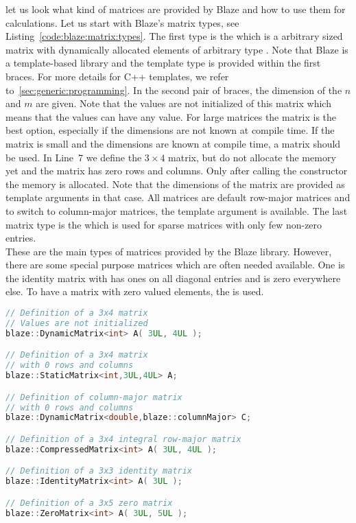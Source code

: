 let us look what kind of matrices are provided by Blaze and how to use them for calculations. Let us start with Blaze's matrix types, see Listing~\ref{code:blaze:matrix:types}. The first type is the  which is a arbitrary sized matrix with dynamically allocated elements of arbitrary type . Note that Blaze is a template-based library and the template type is provided within the first braces. For more details for C++ templates, we refer to~\ref{sec:generic:programming}. In the second pair of braces, the dimension of the $n$ and $m$ are given. Note that the values are not initialized of this matrix which means that the values can have any value. For large matrices the  matrix is the best option, especially if the dimensions are not known at compile time. If the matrix is small and the dimensions are known at compile time, a  matrix should be used. In Line~7 we define the $3\times 4$ matrix, but do not allocate the memory yet and the matrix has zero rows and columns. Only after calling the constructor the memory is allocated. Note that the dimensions of the matrix are provided as template arguments in that case. All matrices are default row-major matrices and to switch to column-major matrices, the template argument  is available. The last matrix type is the  which is used for sparse matrices with only few non-zero entries.\\

These are the main types of matrices provided by the Blaze library. However, there are some special purpose matrices which are often needed available. One is the identity matrix  with has ones on all diagonal entries and is zero everywhere else. To have a matrix with zero valued elements, the  is used.
 
\begin{lstlisting}[language=c++,caption={Blaze matrix types.\label{code:blaze:matrix:types}},float,floatplacement=tb]
// Definition of a 3x4 matrix 
// Values are not initialized
blaze::DynamicMatrix<int> A( 3UL, 4UL );

// Definition of a 3x4 matrix
// with 0 rows and columns
blaze::StaticMatrix<int,3UL,4UL> A;

// Definition of column-major matrix
// with 0 rows and columns
blaze::DynamicMatrix<double,blaze::columnMajor> C;

// Definition of a 3x4 integral row-major matrix
blaze::CompressedMatrix<int> A( 3UL, 4UL );

// Definition of a 3x3 identity matrix
blaze::IdentityMatrix<int> A( 3UL );

// Definition of a 3x5 zero matrix
blaze::ZeroMatrix<int> A( 3UL, 5UL );
\end{lstlisting}

